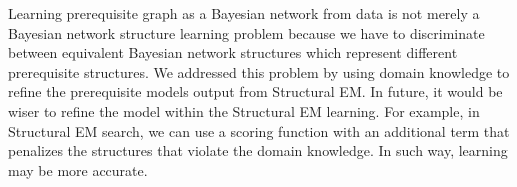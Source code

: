 \documentclass{edm_template}
\begin{document}
	
	
	Learning prerequisite graph as a Bayesian network from data is not merely a Bayesian network structure learning problem 
	because we have to discriminate between equivalent Bayesian network structures which represent different prerequisite structures.
    We addressed this problem by using domain knowledge to refine the prerequisite models output from Structural EM.
	In future, it would be wiser to refine the model within the Structural EM learning. 
	For example, in Structural EM search, we can use a scoring function with an additional term that penalizes the structures that violate the domain knowledge. 
	In such way, learning may be more accurate.
	
\end{document}

